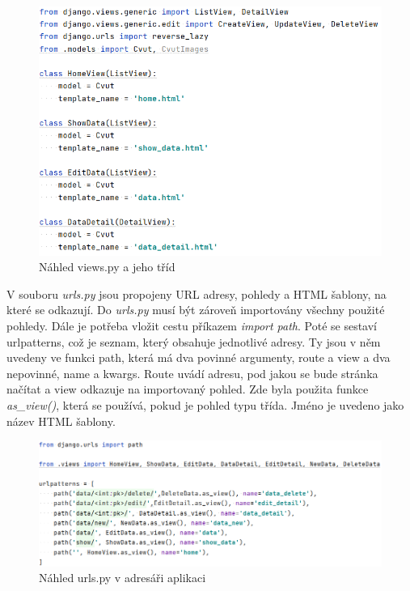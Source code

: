 \begin{figure}[H] \centering
    \includegraphics[width=350pt]{./pictures/6-nahled-views-aplikace.PNG}
    \caption[Náhled views.py a jeho tříd]{Náhled views.py a jeho tříd}
	\label{fig:Náhled views.py a jeho tříd}              
\end{figure}


V souboru \emph{urls.py} jsou propojeny URL adresy, pohledy a HTML
šablony, na které se odkazují. Do \emph{urls.py} musí být zároveň importovány
všechny použité pohledy. Dále je potřeba vložit cestu příkazem \emph{import path}. 
Poté se sestaví urlpatterns, což je seznam, který obsahuje jednotlivé
adresy. Ty jsou v něm uvedeny ve funkci path, která má dva povinné
argumenty, route a view a dva nepovinné, name a kwargs. Route uvádí
adresu, pod jakou se bude stránka načítat a view odkazuje na
importovaný pohled. Zde byla použita funkce \emph{as\_view()}, která
se používá, pokud je pohled typu třída. Jméno je uvedeno jako název
HTML šablony.

\begin{figure}[H] \centering
    \includegraphics[width=450pt]{./pictures/7-urls-aplikace.PNG}
    \caption[Náhled urls.py v adresáři aplikaci]{Náhled urls.py v adresáři aplikaci}
	\label{fig:Náhled urls.py v adresáři aplikaci}              
\end{figure}

